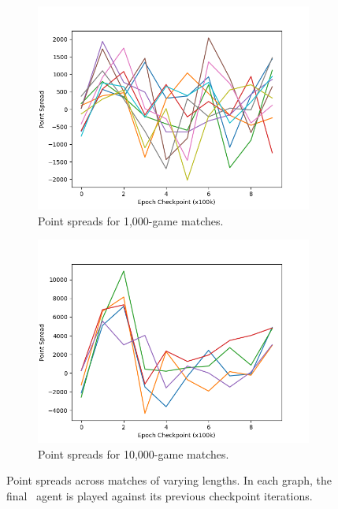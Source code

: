 \begin{figure}
\begin{subfigure}[b]{0.66\textwidth}
	\center
	\includegraphics[width=\textwidth]{images/discussion/usefulness/r2-time-series-1000.png}
	\caption{Point spreads for 1,000-game matches.}
	\label{r2-time-series-1000}
\end{subfigure}

\begin{subfigure}[b]{0.66\textwidth}
	\center
	\includegraphics[width=\textwidth]{images/discussion/usefulness/r2-time-series-10000.png}
	\caption{Point spreads for 10,000-game matches.}
	\label{r2-time-series-10000}
\end{subfigure}

\caption{
	Point spreads across matches of varying lengths.
	In each graph,
	the final \learned\ agent is played against its previous checkpoint
	iterations.
}
\label{fig:r2-time-series}
\end{figure}
